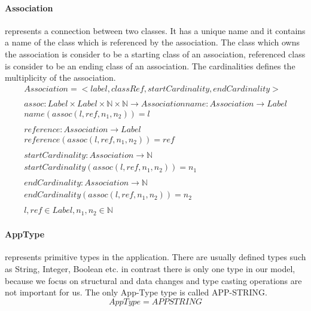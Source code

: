 \documentclass[11pt]{article}
\begin{document}
\paragraph {Association} represents a connection between two classes. It has a unique name and it contains a name of the class which is referenced by the association. The class which owns the association is consider to be a starting class of an association, referenced class is consider to be an ending class of an association. The cardinalities defines the multiplicity of the association.
\begin{gather*}
Association = <label, classRef, startCardinality, endCardinality> \\ \\
assoc : Label \times Label \times \mathbb{N} \times \mathbb{N} \rightarrow Association
name : Association \rightarrow Label \\
name(assoc(l, ref, n_1, n_2)) = l\\ \\
reference : Association \rightarrow Label \\
reference(assoc(l, ref, n_1, n_2)) = ref\\ \\
startCardinality : Association \rightarrow \mathbb{N} \\
startCardinality(assoc(l, ref, n_1, n_2)) = n_1\\ \\
endCardinality : Association \rightarrow \mathbb{N} \\
endCardinality(assoc(l, ref, n_1, n_2)) = n_2 \\ \\
l, ref \in Label,  n_1, n_2 \in \mathbb{N}
\end{gather*}



\paragraph{AppType} represents primitive types in the application. There are usually defined types such as String, Integer, Boolean etc. in contrast there is only one type in our model, because we focus on structural and data changes and type casting operations are not important for us. The only App-Type type is called APP-STRING.
$$
AppType = APPSTRING
$$

\end{document}
